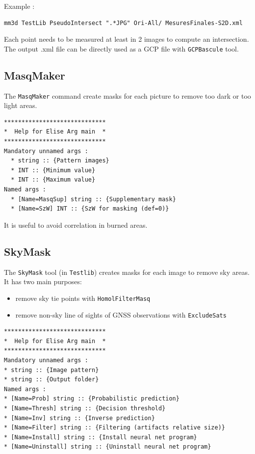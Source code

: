 Example :
\begin{verbatim}
mm3d TestLib PseudoIntersect ".*JPG" Ori-All/ MesuresFinales-S2D.xml
\end{verbatim}

Each point needs to be measured at least in 2 images to compute an intersection.
The output .xml file can be directly used as a GCP file with {\tt GCPBascule} tool.

\subsection{MasqMaker}
The {\tt MasqMaker} command create masks for each picture to remove too dark or too light areas.

\begin{verbatim}
*****************************
*  Help for Elise Arg main  *
*****************************
Mandatory unnamed args : 
  * string :: {Pattern images}
  * INT :: {Minimum value}
  * INT :: {Maximum value}
Named args : 
  * [Name=MasqSup] string :: {Supplementary mask}
  * [Name=SzW] INT :: {SzW for masking (def=0)}
\end{verbatim}

It is useful to avoid correlation in burned areas.


\subsection{SkyMask}

The {\tt SkyMask} tool (in {\tt Testlib}) creates masks for each image to remove sky areas. It has two main purposes: \newline

\begin{itemize}
	\item remove sky tie points with \texttt{HomolFilterMasq}
	\item remove non-sky line of sights of GNSS observations with \texttt{ExcludeSats} \newline
\end{itemize}

\begin{verbatim}
*****************************
*  Help for Elise Arg main  *
*****************************
Mandatory unnamed args : 
* string :: {Image pattern}
* string :: {Output folder}
Named args : 
* [Name=Prob] string :: {Probabilistic prediction}
* [Name=Thresh] string :: {Decision threshold}
* [Name=Inv] string :: {Inverse prediction}
* [Name=Filter] string :: {Filtering (artifacts relative size)}
* [Name=Install] string :: {Install neural net program}
* [Name=Uninstall] string :: {Uninstall neural net program}
\end{verbatim}

